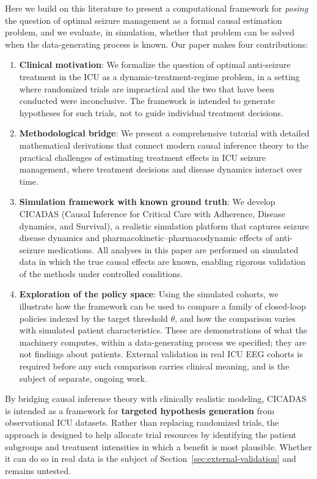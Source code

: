 Here we build on this literature to present a computational framework for \emph{posing} the question of optimal seizure management as a formal causal estimation problem, and we evaluate, in simulation, whether that problem can be solved when the data-generating process is known. Our paper makes four contributions:
\begin{enumerate}
\item \textbf{Clinical motivation}: We formalize the question of optimal anti-seizure treatment in the ICU as a dynamic-treatment-regime problem, in a setting where randomized trials are impractical and the two that have been conducted were inconclusive. The framework is intended to generate hypotheses for such trials, not to guide individual treatment decisions.

\item \textbf{Methodological bridge}: We present a comprehensive tutorial with detailed mathematical derivations that connect modern causal inference theory to the practical challenges of estimating treatment effects in ICU seizure management, where treatment decisions and disease dynamics interact over time.

\item \textbf{Simulation framework with known ground truth}: We develop CICADAS (Causal Inference for Critical Care with Adherence, Disease dynamics, and Survival), a realistic simulation platform that captures seizure disease dynamics and pharmacokinetic--pharmacodynamic effects of anti-seizure medications. All analyses in this paper are performed on simulated data in which the true causal effects are known, enabling rigorous validation of the methods under controlled conditions.

\item \textbf{Exploration of the policy space}: Using the simulated cohorts, we illustrate how the framework can be used to compare a family of closed-loop policies indexed by the target threshold $\theta$, and how the comparison varies with simulated patient characteristics. These are demonstrations of what the machinery computes, within a data-generating process we specified; they are not findings about patients. External validation in real ICU EEG cohorts is required before any such comparison carries clinical meaning, and is the subject of separate, ongoing work.
\end{enumerate}

By bridging causal inference theory with clinically realistic modeling, CICADAS is intended as a framework for \textbf{targeted hypothesis generation} from observational ICU datasets. Rather than replacing randomized trials, the approach is designed to help allocate trial resources by identifying the patient subgroups and treatment intensities in which a benefit is most plausible. Whether it can do so in real data is the subject of Section~\ref{sec:external-validation} and remains untested.

